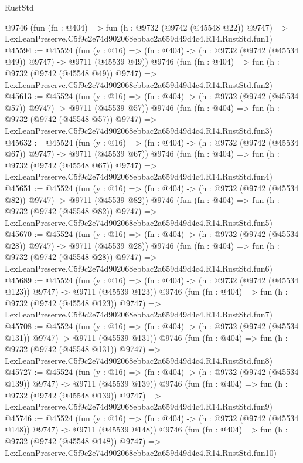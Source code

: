 \begin{lexlean}{RustStd}
\begin{coremodule}
    @9746
    (fun (fn : @404) =>
    fun (h : @9732 (@9742 (@45548 @22)) @9747) =>
    LexLeanPreserve.C5f9c2e74d902068ebbac2a659d49d4c4.R14.RustStd.fun1)
@45594 := @45524
    (fun (y : @16) => (fn : @404) -> (h : @9732 (@9742 (@45534 @49)) @9747) -> @9711 (@45539 @49))
    @9746
    (fun (fn : @404) =>
    fun (h : @9732 (@9742 (@45548 @49)) @9747) =>
    LexLeanPreserve.C5f9c2e74d902068ebbac2a659d49d4c4.R14.RustStd.fun2)
@45613 := @45524
    (fun (y : @16) => (fn : @404) -> (h : @9732 (@9742 (@45534 @57)) @9747) -> @9711 (@45539 @57))
    @9746
    (fun (fn : @404) =>
    fun (h : @9732 (@9742 (@45548 @57)) @9747) =>
    LexLeanPreserve.C5f9c2e74d902068ebbac2a659d49d4c4.R14.RustStd.fun3)
@45632 := @45524
    (fun (y : @16) => (fn : @404) -> (h : @9732 (@9742 (@45534 @67)) @9747) -> @9711 (@45539 @67))
    @9746
    (fun (fn : @404) =>
    fun (h : @9732 (@9742 (@45548 @67)) @9747) =>
    LexLeanPreserve.C5f9c2e74d902068ebbac2a659d49d4c4.R14.RustStd.fun4)
@45651 := @45524
    (fun (y : @16) => (fn : @404) -> (h : @9732 (@9742 (@45534 @82)) @9747) -> @9711 (@45539 @82))
    @9746
    (fun (fn : @404) =>
    fun (h : @9732 (@9742 (@45548 @82)) @9747) =>
    LexLeanPreserve.C5f9c2e74d902068ebbac2a659d49d4c4.R14.RustStd.fun5)
@45670 := @45524
    (fun (y : @16) => (fn : @404) -> (h : @9732 (@9742 (@45534 @28)) @9747) -> @9711 (@45539 @28))
    @9746
    (fun (fn : @404) =>
    fun (h : @9732 (@9742 (@45548 @28)) @9747) =>
    LexLeanPreserve.C5f9c2e74d902068ebbac2a659d49d4c4.R14.RustStd.fun6)
@45689 := @45524
    (fun (y : @16) => (fn : @404) -> (h : @9732 (@9742 (@45534 @123)) @9747) -> @9711 (@45539 @123))
    @9746
    (fun (fn : @404) =>
    fun (h : @9732 (@9742 (@45548 @123)) @9747) =>
    LexLeanPreserve.C5f9c2e74d902068ebbac2a659d49d4c4.R14.RustStd.fun7)
@45708 := @45524
    (fun (y : @16) => (fn : @404) -> (h : @9732 (@9742 (@45534 @131)) @9747) -> @9711 (@45539 @131))
    @9746
    (fun (fn : @404) =>
    fun (h : @9732 (@9742 (@45548 @131)) @9747) =>
    LexLeanPreserve.C5f9c2e74d902068ebbac2a659d49d4c4.R14.RustStd.fun8)
@45727 := @45524
    (fun (y : @16) => (fn : @404) -> (h : @9732 (@9742 (@45534 @139)) @9747) -> @9711 (@45539 @139))
    @9746
    (fun (fn : @404) =>
    fun (h : @9732 (@9742 (@45548 @139)) @9747) =>
    LexLeanPreserve.C5f9c2e74d902068ebbac2a659d49d4c4.R14.RustStd.fun9)
@45746 := @45524
    (fun (y : @16) => (fn : @404) -> (h : @9732 (@9742 (@45534 @148)) @9747) -> @9711 (@45539 @148))
    @9746
    (fun (fn : @404) =>
    fun (h : @9732 (@9742 (@45548 @148)) @9747) =>
    LexLeanPreserve.C5f9c2e74d902068ebbac2a659d49d4c4.R14.RustStd.fun10)

\end{coremodule}
\end{lexlean}

